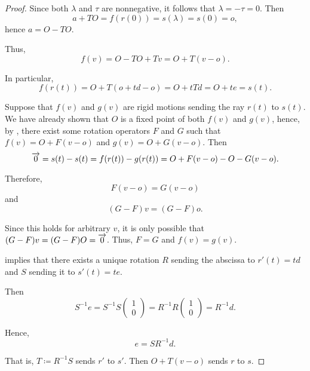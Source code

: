 \begin{proof}
  Since both \( \lambda \) and \( \tau \) are nonnegative, it follows that \( \lambda = -\tau = 0 \). Then
  \begin{equation*}
    a + T O = f(r(0)) = s(\lambda) = s(0) = o,
  \end{equation*}
  hence \( a = O - T O \).

  Thus,
  \begin{equation*}
    f(v) = O - T O + Tv = O + T(v - o).
  \end{equation*}

  In particular,
  \begin{equation*}
    f(r(t)) = O + T(o + td - o) = O + t Td = O + te = s(t).
  \end{equation*}

  \UniquenessSubProof Suppose that \( f(v) \) and \( g(v) \) are rigid motions sending the ray \( r(t) \) to \( s(t) \). We have already shown that \( O \) is a fixed point of both \( f(v) \) and \( g(v) \), hence, by , there exist some rotation operators \( F \) and \( G \) such that \( f(v) = O + F(v - o) \) and \( g(v) = O + G(v - o) \). Then
  \begin{equation*}
    \overrightarrow{0} = s(t) - s(t) = f(r(t)) - g(r(t)) = O + F(v - o) - O - G(v - o).
  \end{equation*}

  Therefore,
  \begin{equation*}
    F(v - o) = G(v - o)
  \end{equation*}
  and
  \begin{equation*}
    (G - F) v = (G - F) o.
  \end{equation*}

  Since this holds for arbitrary \( v \), it is only possible that \( (G - F) v = (G - F) O = \overrightarrow{0} \). Thus, \( F = G \) and \( f(v) = g(v) \).

  \ExistenceSubProof {} implies that there exists a unique rotation \( R \) sending the abscissa to \( r'(t) = td \) and \( S \) sending it to \( s'(t) = te \).

  Then
  \begin{equation*}
    S^{-1} e
    =
    S^{-1} S \begin{pmatrix} 1 \\ 0 \end{pmatrix}
    =
    R^{-1} R \begin{pmatrix} 1 \\ 0 \end{pmatrix}
    =
    R^{-1} d.
  \end{equation*}

  Hence,
  \begin{equation*}
    e = S R^{-1} d.
  \end{equation*}

  That is, \( T \coloneqq R^{-1} S \) sends \( r' \) to \( s' \). Then \( O + T(v - o) \) sends \( r \) to \( s \).
\end{proof}

